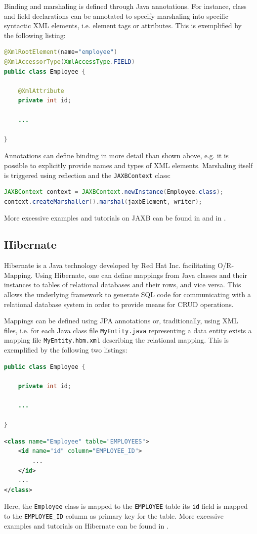 Binding and marshaling is defined through \gls{Java} annotations.
For instance, class and field declarations can be annotated to specify marshaling into specific syntactic \gls{XML} elements, i.e. element tags or attributes.
This is exemplified by the following listing:
\begin{lstlisting}[language=Java,numbers=none]
@XmlRootElement(name="employee")
@XmlAccessorType(XmlAccessType.FIELD)
public class Employee {

	@XmlAttribute
	private int id;
	
	...
	
}
\end{lstlisting}
Annotations can define binding in more detail than shown above, e.g. it is possible to explicitly provide names and types of \gls{XML} elements.
Marshaling itself is triggered using reflection and the \texttt{JAXBContext} class:
\begin{lstlisting}[language=Java,numbers=none]
JAXBContext context = JAXBContext.newInstance(Employee.class);
context.createMarshaller().marshal(jaxbElement, writer);
\end{lstlisting}
More excessive examples and tutorials on \gls{JAXB} can be found in \cite{JAXB} and in \cite{JAXBTutorial}.

\subsection{Hibernate}
\label{subsection:Hibernate}
\gls{Hibernate} \cite{HibernateORM} is a \gls{Java} technology developed by Red Hat Inc. facilitating \gls{O/R-Mapping}.
Using \gls{Hibernate}, one can define mappings from \gls{Java} classes and their instances to tables of relational databases and their rows, and vice versa.
This allows the underlying framework to generate \gls{SQL} code for communicating with a relational database system in order to provide means for CRUD operations.

Mappings can be defined using \gls{JPA} annotations or, traditionally, using \gls{XML} files, i.e. for each \gls{Java} class file \texttt{MyEntity.java} representing a data entity exists a mapping file \texttt{MyEntity.hbm.xml} describing the relational mapping.
This is exemplified by the following two listings:
\begin{lstlisting}[language=Java,numbers=none]
public class Employee {

	private int id;
	
	...
	
}
\end{lstlisting}
\begin{lstlisting}[language=Xml,numbers=none]
<class name="Employee" table="EMPLOYEES">
	<id name="id" column="EMPLOYEE_ID">
	    ...
	</id>
    ...	
</class>
\end{lstlisting}
Here, the \texttt{Employee} class is mapped to the \texttt{EMPLOYEE} table its \texttt{id} field is mapped to the \texttt{EMPLOYEE\_ID} column as primary key for the table. More excessive examples and tutorials on \gls{Hibernate} can be found in \cite{HibernateORM}.


